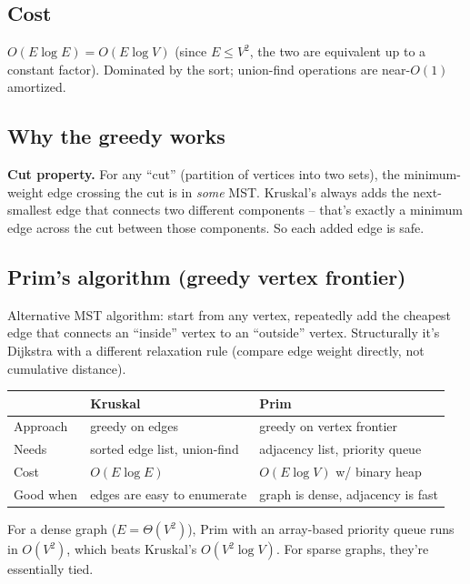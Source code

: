 \documentclass[11pt]{article}
\begin{document}
\subsection*{Cost}

$O(E \log E) = O(E \log V)$ (since $E \leq V^2$, the two are equivalent up to a constant factor). Dominated by the sort; union-find operations are near-$O(1)$ amortized.

\subsection*{Why the greedy works}

\begin{ideabox}
\textbf{Cut property.} For any ``cut'' (partition of vertices into two sets), the minimum-weight edge crossing the cut is in \emph{some} MST. Kruskal's always adds the next-smallest edge that connects two different components -- that's exactly a minimum edge across the cut between those components. So each added edge is safe.
\end{ideabox}

\subsection*{Prim's algorithm (greedy vertex frontier)}

Alternative MST algorithm: start from any vertex, repeatedly add the cheapest edge that connects an ``inside'' vertex to an ``outside'' vertex. Structurally it's Dijkstra with a different relaxation rule (compare edge weight directly, not cumulative distance).

\begin{center}
\begin{tabular}{lll}
\hline
& Kruskal & Prim \\
\hline
Approach & greedy on edges & greedy on vertex frontier \\
Needs & sorted edge list, union-find & adjacency list, priority queue \\
Cost & $O(E \log E)$ & $O(E \log V)$ w/ binary heap \\
Good when & edges are easy to enumerate & graph is dense, adjacency is fast \\
\hline
\end{tabular}
\end{center}

\begin{notebox}
For a dense graph ($E = \Theta(V^2)$), Prim with an array-based priority queue runs in $O(V^2)$, which beats Kruskal's $O(V^2 \log V)$. For sparse graphs, they're essentially tied.
\end{notebox}
\end{document}
